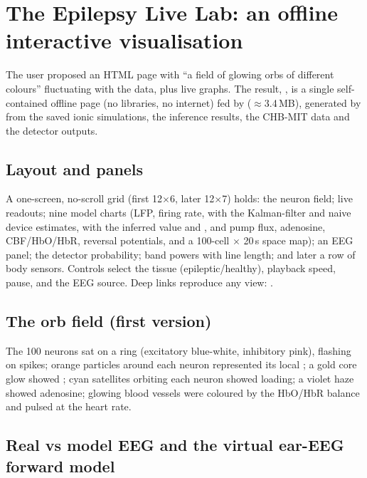 \section{The Epilepsy Live Lab: an offline interactive visualisation}
\label{sec:livelab}

The user proposed an HTML page with ``a field of glowing orbs of different colours'' fluctuating with the data, plus live graphs. The result, , is a single self-contained offline page (no libraries, no internet) fed by  ($\approx$3.4\,MB), generated by  from the saved ionic simulations, the inference results, the CHB-MIT data and the detector outputs.

\subsection{Layout and panels}

A one-screen, no-scroll grid (first 12$\times$6, later 12$\times$7) holds: the neuron field; live readouts; nine model charts (LFP, firing rate, \Ko{} with the Kalman-filter and naive device estimates, \Cli{} with the inferred value and \EGABA, \Nai{} and pump flux, adenosine, CBF/HbO/HbR, reversal potentials, and a 100-cell $\times$ 20\,s \Ko{} space map); an EEG panel; the detector probability; band powers with line length; and later a row of body sensors. Controls select the tissue (epileptic/healthy), playback speed, pause, and the EEG source. Deep links reproduce any view: .

\subsection{The orb field (first version)}

The 100 neurons sat on a ring (excitatory blue-white, inhibitory pink), flashing on spikes; orange particles around each neuron represented its local \Ko; a gold core glow showed \Nai; cyan satellites orbiting each neuron showed \Cli{} loading; a violet haze showed adenosine; glowing blood vessels were coloured by the HbO/HbR balance and pulsed at the heart rate.

\subsection{Real vs model EEG and the virtual ear-EEG forward model}

